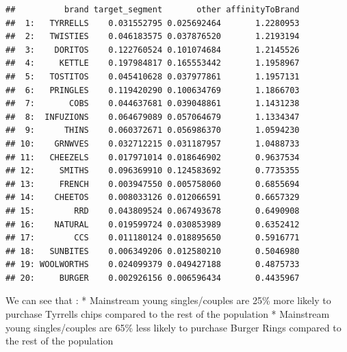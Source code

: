 \documentclass[
]{article}
\begin{document}
\begin{verbatim}
##          brand target_segment       other affinityToBrand
##  1:   TYRRELLS    0.031552795 0.025692464       1.2280953
##  2:   TWISTIES    0.046183575 0.037876520       1.2193194
##  3:    DORITOS    0.122760524 0.101074684       1.2145526
##  4:     KETTLE    0.197984817 0.165553442       1.1958967
##  5:   TOSTITOS    0.045410628 0.037977861       1.1957131
##  6:   PRINGLES    0.119420290 0.100634769       1.1866703
##  7:       COBS    0.044637681 0.039048861       1.1431238
##  8:  INFUZIONS    0.064679089 0.057064679       1.1334347
##  9:      THINS    0.060372671 0.056986370       1.0594230
## 10:    GRNWVES    0.032712215 0.031187957       1.0488733
## 11:   CHEEZELS    0.017971014 0.018646902       0.9637534
## 12:     SMITHS    0.096369910 0.124583692       0.7735355
## 13:     FRENCH    0.003947550 0.005758060       0.6855694
## 14:    CHEETOS    0.008033126 0.012066591       0.6657329
## 15:        RRD    0.043809524 0.067493678       0.6490908
## 16:    NATURAL    0.019599724 0.030853989       0.6352412
## 17:        CCS    0.011180124 0.018895650       0.5916771
## 18:   SUNBITES    0.006349206 0.012580210       0.5046980
## 19: WOOLWORTHS    0.024099379 0.049427188       0.4875733
## 20:     BURGER    0.002926156 0.006596434       0.4435967
\end{verbatim}

We can see that : * Mainstream young singles/couples are 25\% more
likely to purchase Tyrrells chips compared to the rest of the population
* Mainstream young singles/couples are 65\% less likely to purchase
Burger Rings compared to the rest of the population
\end{document}
